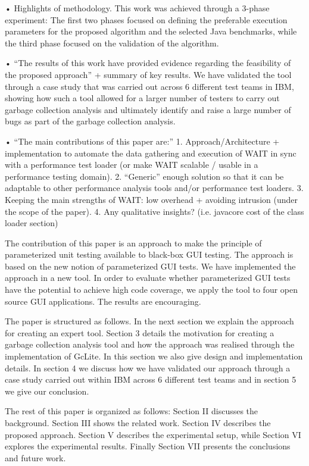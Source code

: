\documentclass[runningheads,a4paper]{llncs}
\begin{document}
•	Highlights of methodology.
This work was achieved through a 3-phase experiment: The first two phases
focused on defining the preferable execution parameters for the proposed algorithm and the 
selected Java benchmarks, while the third phase focused on the validation of the algorithm. 

•	“The results of this work have provided evidence regarding the feasibility of the proposed approach” + summary of key results.
We have validated the tool through a case study that was carried out across 6
different test teams in IBM, showing how such a tool allowed for a larger number of testers to carry out garbage collection analysis and ultimately identify and raise a large number of bugs as part of the garbage collection analysis.

•	“The main contributions of this paper are:”
1. Approach/Architecture + implementation to automate the data gathering and execution of WAIT in sync with a performance test loader (or make WAIT scalable / usable in a performance testing domain).
2. “Generic” enough solution so that it can be adaptable to other performance analysis tools and/or performance test loaders.
3. Keeping the main strengths of WAIT: low overhead + avoiding intrusion (under the scope of the paper).
4. Any qualitative insights? (i.e. javacore cost of the class loader section)

The contribution of this paper is an approach to make the principle of
parameterized unit testing available to black-box GUI testing. The approach is based on the new notion of
parameterized GUI tests. We have implemented the approach in a new tool. In
order to evaluate whether parameterized GUI tests have the potential to achieve high code coverage, we apply the tool to four open
source GUI applications. The results are encouraging.





The paper is structured as follows. In the next section we explain the approach
for creating an expert tool. Section 3 details the motivation for creating a garbage 
collection analysis tool and how the approach was realised through the implementation of 
GcLite. In this section we also give design and implementation details. In section 4 we 
discuss how we have validated our approach through a case study carried out within IBM 
across 6 different test teams and in section 5 we give our conclusion.

The rest of this paper is organized as follows: Section
II discusses the background. Section III shows the related work. Section IV describes the 
proposed approach. Section V describes the experimental setup, while Section VI explores 
the experimental results. Finally Section VII presents the conclusions and future work.
\end{document}
